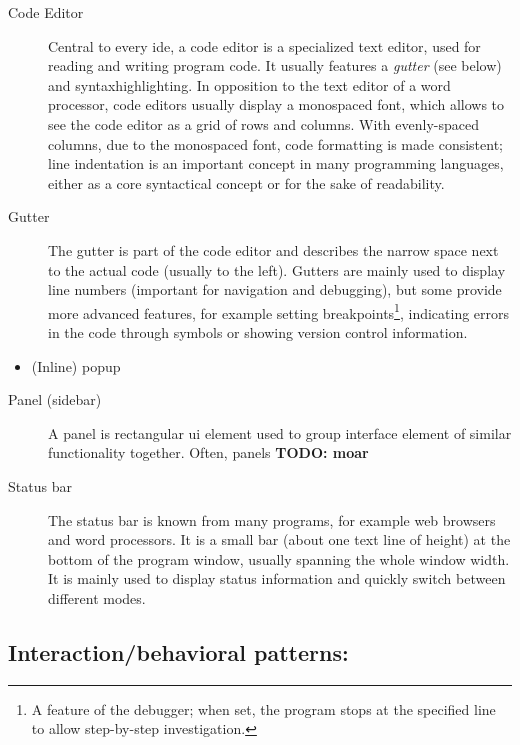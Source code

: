 \begin{description}
\item[Code Editor]
Central to every \gls{ide}, a code editor is a specialized text editor,
used for reading and writing program code. It usually features a
\emph{gutter} (see below) and \gls{syntaxhighlighting}. In opposition to
the text editor of a word processor, code editors usually display a
monospaced font, which allows to see the code editor as a grid of rows
and columns. With evenly-spaced columns, due to the monospaced font,
code formatting is made consistent; line indentation is an important
concept in many programming languages, either as a core syntactical
concept or for the sake of readability.
\item[Gutter]
The gutter is part of the code editor and describes the narrow space
next to the actual code (usually to the left). Gutters are mainly used
to display line numbers (important for navigation and debugging), but
some provide more advanced features, for example setting
breakpoints\footnote{A feature of the debugger; when set, the program
  stops at the specified line to allow step-by-step investigation.},
indicating errors in the code through symbols or showing version control
information.
\end{description}

\begin{itemize}
\itemsep1pt\parskip0pt
\item
  (Inline) popup
\end{itemize}

\begin{description}
\item[Panel (sidebar)]
A panel is rectangular \ac{ui} element used to group interface element
of similar functionality together. Often, panels \textbf{TODO: moar}
\item[Status bar]
The status bar is known from many programs, for example web browsers and
word processors. It is a small bar (about one text line of height) at
the bottom of the program window, usually spanning the whole window
width. It is mainly used to display status information and quickly
switch between different modes.
\end{description}

\subsection{Interaction/behavioral
patterns:}\label{interactionbehavioral-patterns}

